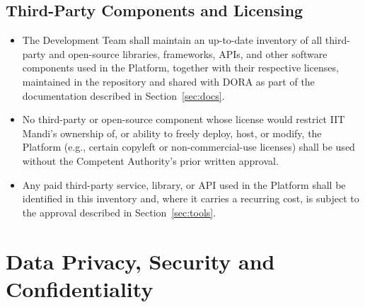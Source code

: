 \documentclass[11pt]{article}
\begin{document}
\subsection{Third-Party Components and Licensing}
\label{sec:licensing}
\begin{itemize}[leftmargin=1.4em, itemsep=3pt]
\item The Development Team shall maintain an up-to-date inventory of all third-party and open-source libraries, frameworks, APIs, and other software components used in the Platform, together with their respective licenses, maintained in the repository and shared with DORA as part of the documentation described in Section~\ref{sec:docs}.
\item No third-party or open-source component whose license would restrict IIT Mandi's ownership of, or ability to freely deploy, host, or modify, the Platform (e.g., certain copyleft or non-commercial-use licenses) shall be used without the Competent Authority's prior written approval.
\item Any paid third-party service, library, or API used in the Platform shall be identified in this inventory and, where it carries a recurring cost, is subject to the approval described in Section~\ref{sec:tools}.
\end{itemize}

\section{Data Privacy, Security and Confidentiality}
\label{sec:privacy}
\end{document}
